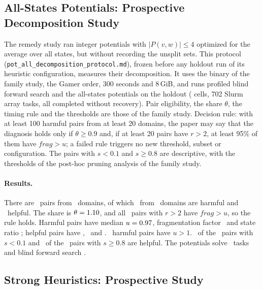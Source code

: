 \documentclass[letterpaper]{article}
\newcommand{\num}[1]{\numprint{#1}}
\newcommand{\fragfactor}{\ensuremath{\mathit{frag}}}
\theoremstyle{plain}
\theoremstyle{definition}
\theoremstyle{remark}
\begin{document}
\subsection{All-States Potentials: Prospective Decomposition Study}
\label{sec:supp-pot-all}

The remedy study ran integer potentials with $|P(v,w)|\leq4$ optimized for
the average over all states, but without recording the unsplit sets.  This
protocol (\texttt{pot\_\allowbreak all\_\allowbreak decomposition\_\allowbreak protocol.md}), frozen before any
holdout run of its heuristic configuration, measures their decomposition.
It uses the binary of the family study, the Gamer order, 300 seconds and
8\,GiB, and runs profiled blind forward search and the all-states potentials
on the holdout (\num{\PotAllCells} cells, 702 Slurm array tasks, all
completed without recovery).  Pair eligibility, the share $\theta$, the
timing rule and the thresholds are those of the family study.  Decision
rule: with at least 100 harmful pairs from at least 20 domains, the paper
may say that the diagnosis holds only if $\theta\geq0.9$ and, if at least 20
pairs have $r>2$, at least 95\% of them have $\fragfactor>u$; a failed rule
triggers no new threshold, subset or configuration.  The pairs with $s<0.1$
and $s\geq0.8$ are descriptive, with the thresholds of the post-hoc pruning
analysis of the family study.

\paragraph{Results.}
There are \PotAllPairs\ pairs from \PotAllPairDomains\ domains, of which
\PotAllHarmful\ from \PotAllHarmfulDomains\ domains are harmful and
\PotAllHelpful\ helpful.  The share is $\theta=1.10$, and all
\PotAllStrong\ pairs with $r>2$ have $\fragfactor>u$, so the rule holds.
Harmful pairs have median $u=0.97$, fragmentation factor
\PotAllHurtFrag\ and state ratio \PotAllHurtStates; helpful pairs have
\PotAllHelpUnion, \PotAllHelpFrag\ and \PotAllHelpStates.
\PotAllHurtUnionAboveOne\ harmful pairs have $u>1$.  \PotAllLowHelpful\ of
the \PotAllLowPairs\ pairs with $s<0.1$ and \PotAllHighHelpful\ of the
\PotAllHighPairs\ pairs with $s\geq0.8$ are helpful.  The potentials solve
\PotAllSolved\ tasks and blind forward search \PotAllBlindSolved.

\subsection{Strong Heuristics: Prospective Study}
\label{sec:supp-strong}
\end{document}
